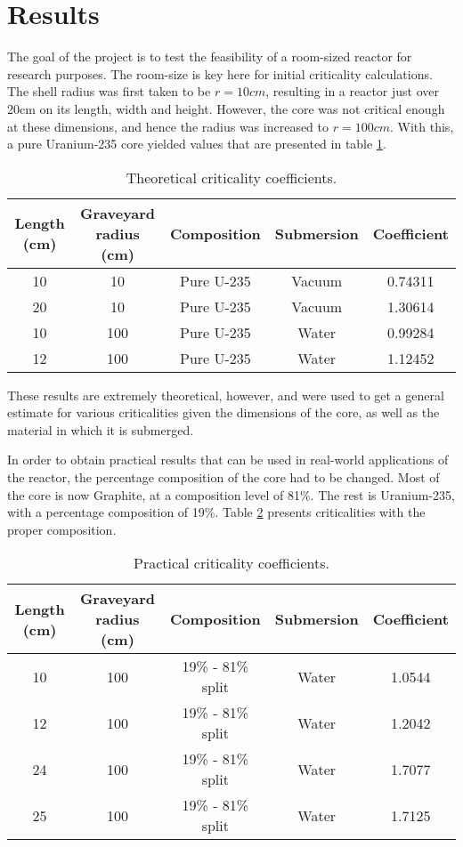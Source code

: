 \label{sec:results}
\section{Results}

The goal of the project is to test the feasibility of a room-sized reactor for research purposes. The room-size is key here for initial criticality calculations. The shell radius was first taken to be $r=10cm$, resulting in a reactor just over 20cm on its length, width and height. However, the core was not critical enough at these dimensions, and hence the radius was increased to $r=100cm$. With this, a pure Uranium-235 core yielded values that are presented in table \ref{tab:pure}.
\begin{table}[!htbp]
\centering
\caption{Theoretical criticality coefficients.}
\label{tab:pure}
\begin{tabular}{|c|c|c|c|c|}
\hline
Length (cm) & Graveyard radius (cm) & Composition & Submersion & Coefficient \\
\hline
10 & 10 & Pure U-235  & Vacuum & 0.74311 \\
\hline
20 & 10 & Pure U-235  & Vacuum & 1.30614 \\
\hline
10 & 100 & Pure U-235  & Water & 0.99284 \\
\hline
12 & 100 & Pure U-235  & Water & 1.12452 \\
\hline
\end{tabular}
\end{table}
These results are extremely theoretical, however, and were used to get a general estimate for various criticalities given the dimensions of the core, as well as the material in which it is submerged.

In order to obtain practical results that can be used in real-world applications of the reactor, the percentage composition of the core had to be changed. Most of the core is now Graphite, at a composition level of 81\%. The rest is Uranium-235, with a percentage composition of 19\%. Table \ref{tab:nonpure} presents criticalities with the proper composition.

\begin{table}[!htbp]
\centering
\caption{Practical criticality coefficients.}
\label{tab:nonpure}
\begin{tabular}{|c|c|c|c|c|}
\hline
Length (cm) & Graveyard radius (cm) & Composition & Submersion & Coefficient \\
\hline
10 & 100 & 19\% - 81\% split  & Water & 1.0544 \\
\hline
12 & 100 & 19\% - 81\% split  & Water & 1.2042 \\
\hline
24 & 100 & 19\% - 81\% split  & Water & 1.7077 \\
\hline
25 & 100 & 19\% - 81\% split  & Water & 1.7125 \\
\hline
\end{tabular}
\end{table}
